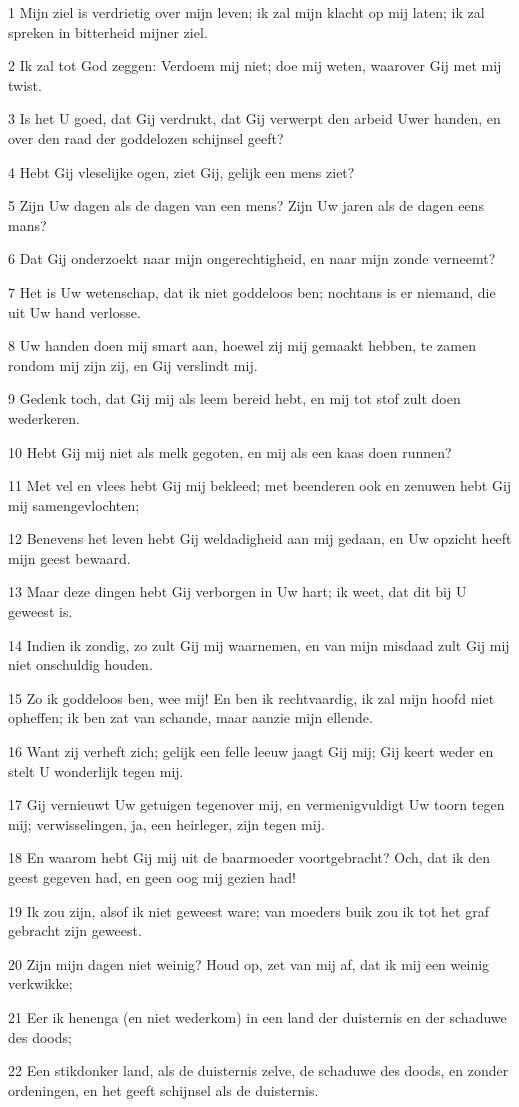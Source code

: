 \par 1 Mijn ziel is verdrietig over mijn leven; ik zal mijn klacht op mij laten; ik zal spreken in bitterheid mijner ziel.
\par 2 Ik zal tot God zeggen: Verdoem mij niet; doe mij weten, waarover Gij met mij twist.
\par 3 Is het U goed, dat Gij verdrukt, dat Gij verwerpt den arbeid Uwer handen, en over den raad der goddelozen schijnsel geeft?
\par 4 Hebt Gij vleselijke ogen, ziet Gij, gelijk een mens ziet?
\par 5 Zijn Uw dagen als de dagen van een mens? Zijn Uw jaren als de dagen eens mans?
\par 6 Dat Gij onderzoekt naar mijn ongerechtigheid, en naar mijn zonde verneemt?
\par 7 Het is Uw wetenschap, dat ik niet goddeloos ben; nochtans is er niemand, die uit Uw hand verlosse.
\par 8 Uw handen doen mij smart aan, hoewel zij mij gemaakt hebben, te zamen rondom mij zijn zij, en Gij verslindt mij.
\par 9 Gedenk toch, dat Gij mij als leem bereid hebt, en mij tot stof zult doen wederkeren.
\par 10 Hebt Gij mij niet als melk gegoten, en mij als een kaas doen runnen?
\par 11 Met vel en vlees hebt Gij mij bekleed; met beenderen ook en zenuwen hebt Gij mij samengevlochten;
\par 12 Benevens het leven hebt Gij weldadigheid aan mij gedaan, en Uw opzicht heeft mijn geest bewaard.
\par 13 Maar deze dingen hebt Gij verborgen in Uw hart; ik weet, dat dit bij U geweest is.
\par 14 Indien ik zondig, zo zult Gij mij waarnemen, en van mijn misdaad zult Gij mij niet onschuldig houden.
\par 15 Zo ik goddeloos ben, wee mij! En ben ik rechtvaardig, ik zal mijn hoofd niet opheffen; ik ben zat van schande, maar aanzie mijn ellende.
\par 16 Want zij verheft zich; gelijk een felle leeuw jaagt Gij mij; Gij keert weder en stelt U wonderlijk tegen mij.
\par 17 Gij vernieuwt Uw getuigen tegenover mij, en vermenigvuldigt Uw toorn tegen mij; verwisselingen, ja, een heirleger, zijn tegen mij.
\par 18 En waarom hebt Gij mij uit de baarmoeder voortgebracht? Och, dat ik den geest gegeven had, en geen oog mij gezien had!
\par 19 Ik zou zijn, alsof ik niet geweest ware; van moeders buik zou ik tot het graf gebracht zijn geweest.
\par 20 Zijn mijn dagen niet weinig? Houd op, zet van mij af, dat ik mij een weinig verkwikke;
\par 21 Eer ik henenga (en niet wederkom) in een land der duisternis en der schaduwe des doods;
\par 22 Een stikdonker land, als de duisternis zelve, de schaduwe des doods, en zonder ordeningen, en het geeft schijnsel als de duisternis.

